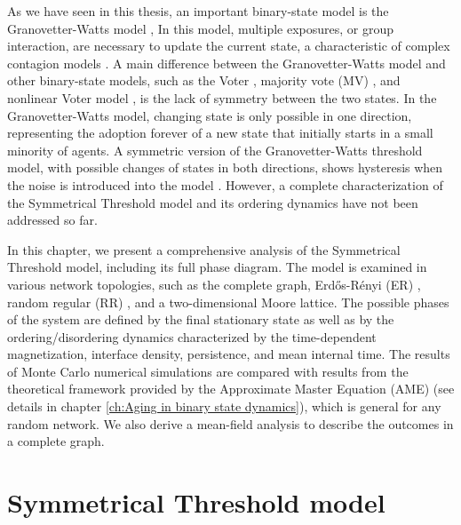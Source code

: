 As we have seen in this thesis, an important binary-state model is the Granovetter-Watts model \cite{granovetter-1978, watts-2002}, In this model, multiple exposures, or group interaction, are necessary to update the current state, a characteristic of complex contagion models \cite{centola-2007,unknown-author-2018}. A main difference between the Granovetter-Watts model and other binary-state models, such as the Voter \cite{Voter-original}, majority vote (MV) \cite{de1992isotropic,pereira2005majority,campos2003small}, and nonlinear Voter model \cite{castellano-2009,mobilia2015nonlinear,mellor2016characterization,Min-2017,jewski-2017,peralta-2018}, is the lack of symmetry between the two states. In the Granovetter-Watts model, changing state is only possible in one direction, representing the adoption forever of a new state that initially starts in a small minority of agents. A symmetric version of the Granovetter-Watts threshold model, with possible changes of states in both directions, shows hysteresis when the noise is introduced into the model \cite{nowak2019homogeneous,nowak2020symmetrical}. However, a complete characterization of the Symmetrical Threshold model and its ordering dynamics have not been addressed so far.

In this chapter, we present a comprehensive analysis of the Symmetrical Threshold model, including its full phase diagram. The model is examined in various network topologies, such as the complete graph, Erd\H{o}s-Rényi (ER)  \cite{erdos1960evolution}, random regular (RR) \cite{wormald1999models}, and a two-dimensional Moore lattice. The possible phases of the system are defined by the final stationary state as well as by the ordering/disordering dynamics characterized by the time-dependent magnetization, interface density, persistence, and mean internal time. The results of Monte Carlo numerical simulations are compared with results from the theoretical framework provided by the Approximate Master Equation (AME) (see details in chapter \ref{ch:Aging in binary state dynamics}), which is general for any random network. We also derive a mean-field analysis to describe the outcomes in a complete graph.

\section{\label{Symmetrical Threshold model} Symmetrical Threshold model}


